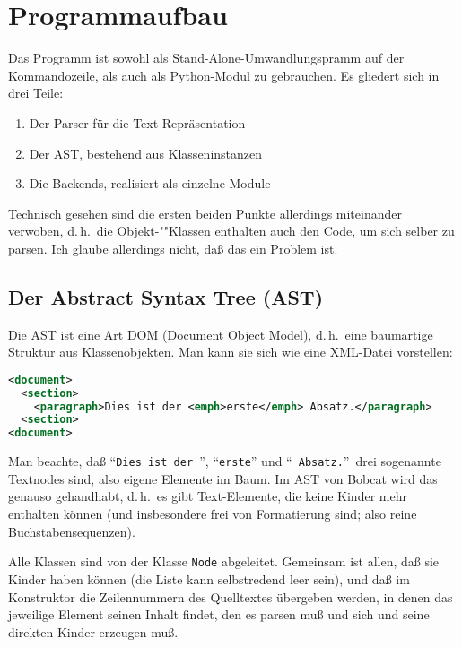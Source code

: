 \documentclass[12pt,openany]{book}
\begin{document}
\section{Programmaufbau}

Das Programm ist sowohl als Stand-Alone-Umwandlungspramm auf der Kommandozeile,
als auch als Python-Modul zu gebrauchen.   Es gliedert sich in drei Teile:

\begin{enumerate}
\item Der Parser für die Text-Repräsentation
\item Der AST, bestehend aus Klasseninstanzen
\item Die Backends, realisiert als einzelne Module
\end{enumerate}

Technisch gesehen sind die ersten beiden Punkte allerdings miteinander
verwoben, d.\,h.\ die Ob\-jekt-""Klas\-sen enthalten auch den Code, um sich selber zu
parsen.  Ich glaube allerdings nicht, daß das ein Problem ist.

\subsection{Der Abstract Syntax Tree (AST)}

Die AST ist eine Art DOM (Document Object Model), d.\,h.\ eine baumartige
Struktur aus Klassenobjekten.  Man kann sie sich wie eine XML-Datei vorstellen:

\begin{lstlisting}[language=XML]
<document>
  <section>
    <paragraph>Dies ist der <emph>erste</emph> Absatz.</paragraph>
  <section>
<document>
\end{lstlisting}

Man beachte, daß "`\texttt{Dies ist der~}"', "`\texttt{erste}"' und
"`~\texttt{Absatz.}"'\ drei sogenannte Textnodes sind, also eigene Elemente im
Baum.  Im AST von Bobcat wird das genauso gehandhabt, d.\,h.\ es gibt
Text-Elemente, die keine Kinder mehr enthalten können (und insbesondere frei
von Formatierung sind; also reine Buchstabensequenzen).

Alle Klassen sind von der Klasse \lstinline{Node} abgeleitet.  Gemeinsam ist
allen, daß sie Kinder haben können (die Liste kann selbstredend leer sein), und
daß im Konstruktor die Zeilennummern des Quelltextes übergeben werden, in denen
das jeweilige Element seinen Inhalt findet, den es parsen muß und sich und
seine direkten Kinder erzeugen muß.
\end{document}

